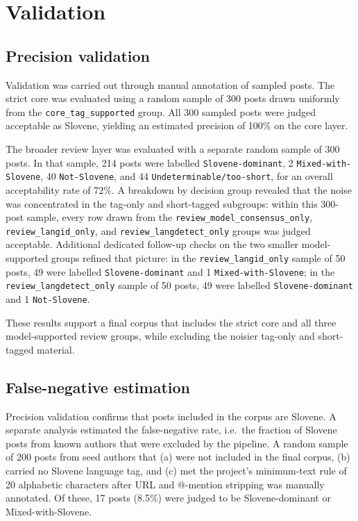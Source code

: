 \section{Validation}
\label{sec:validation}

\subsection{Precision validation}

Validation was carried out through manual annotation of sampled posts. The strict core was evaluated using a random sample of 300 posts drawn uniformly from the \texttt{core\_tag\_supported} group. All 300 sampled posts were judged acceptable as Slovene, yielding an estimated precision of 100\% on the core layer.

The broader review layer was evaluated with a separate random sample of 300 posts. In that sample, 214 posts were labelled \texttt{Slovene-dominant}, 2 \texttt{Mixed-with-Slovene}, 40 \texttt{Not-Slovene}, and 44 \texttt{Undeterminable/too-short}, for an overall acceptability rate of 72\%. A breakdown by decision group revealed that the noise was concentrated in the tag-only and short-tagged subgroups: within this 300-post sample, every row drawn from the \texttt{review\_model\_consensus\_only}, \texttt{review\_langid\_only}, and \texttt{review\_langdetect\_only} groups was judged acceptable. Additional dedicated follow-up checks on the two smaller model-supported groups refined that picture: in the \texttt{review\_langid\_only} sample of 50 posts, 49 were labelled \texttt{Slovene-dominant} and 1 \texttt{Mixed-with-Slovene}; in the \texttt{review\_langdetect\_only} sample of 50 posts, 49 were labelled \texttt{Slovene-dominant} and 1 \texttt{Not-Slovene}.

These results support a final corpus that includes the strict core and all three model-supported review groups, while excluding the noisier tag-only and short-tagged material.

\subsection{False-negative estimation}

Precision validation confirms that posts included in the corpus are Slovene. A separate analysis estimated the false-negative rate, i.e.\ the fraction of Slovene posts from known authors that were excluded by the pipeline. A random sample of 200 posts from seed authors that (a) were not included in the final corpus, (b) carried no Slovene language tag, and (c) met the project's minimum-text rule of 20 alphabetic characters after URL and @-mention stripping was manually annotated. Of these, 17 posts (8.5\%) were judged to be Slovene-dominant or Mixed-with-Slovene.

